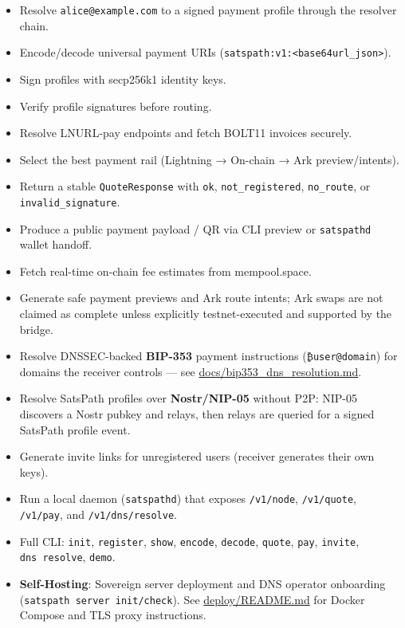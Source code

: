 \documentclass[
]{article}
\providecommand{\tightlist}{%
  \setlength{\itemsep}{0pt}\setlength{\parskip}{0pt}}
\begin{document}
\begin{itemize}
\tightlist
\item
  Resolve \texttt{alice@example.com} to a signed payment profile through
  the resolver chain.
\item
  Encode/decode universal payment URIs
  (\texttt{satspath:v1:\textless{}base64url\_json\textgreater{}}).
\item
  Sign profiles with secp256k1 identity keys.
\item
  Verify profile signatures before routing.
\item
  Resolve LNURL-pay endpoints and fetch BOLT11 invoices securely.
\item
  Select the best payment rail (Lightning → On-chain → Ark
  preview/intents).
\item
  Return a stable \texttt{QuoteResponse} with \texttt{ok},
  \texttt{not\_registered}, \texttt{no\_route}, or
  \texttt{invalid\_signature}.
\item
  Produce a public payment payload / QR via CLI preview or
  \texttt{satspathd} wallet handoff.
\item
  Fetch real-time on-chain fee estimates from mempool.space.
\item
  Generate safe payment previews and Ark route intents; Ark swaps are
  not claimed as complete unless explicitly testnet-executed and
  supported by the bridge.
\item
  Resolve DNSSEC-backed \textbf{BIP-353} payment instructions
  (\texttt{₿user@domain}) for domains the receiver controls --- see
  \url{docs/bip353_dns_resolution.md}.
\item
  Resolve SatsPath profiles over \textbf{Nostr/NIP-05} without P2P:
  NIP-05 discovers a Nostr pubkey and relays, then relays are queried
  for a signed SatsPath profile event.
\item
  Generate invite links for unregistered users (receiver generates their
  own keys).
\item
  Run a local daemon (\texttt{satspathd}) that exposes
  \texttt{/v1/node}, \texttt{/v1/quote}, \texttt{/v1/pay}, and
  \texttt{/v1/dns/resolve}.
\item
  Full CLI: \texttt{init}, \texttt{register}, \texttt{show},
  \texttt{encode}, \texttt{decode}, \texttt{quote}, \texttt{pay},
  \texttt{invite}, \texttt{dns\ resolve}, \texttt{demo}.
\item
  \textbf{Self-Hosting}: Sovereign server deployment and DNS operator
  onboarding (\texttt{satspath\ server\ init/check}). See
  \url{deploy/README.md} for Docker Compose and TLS proxy instructions.
\end{itemize}
\end{document}
